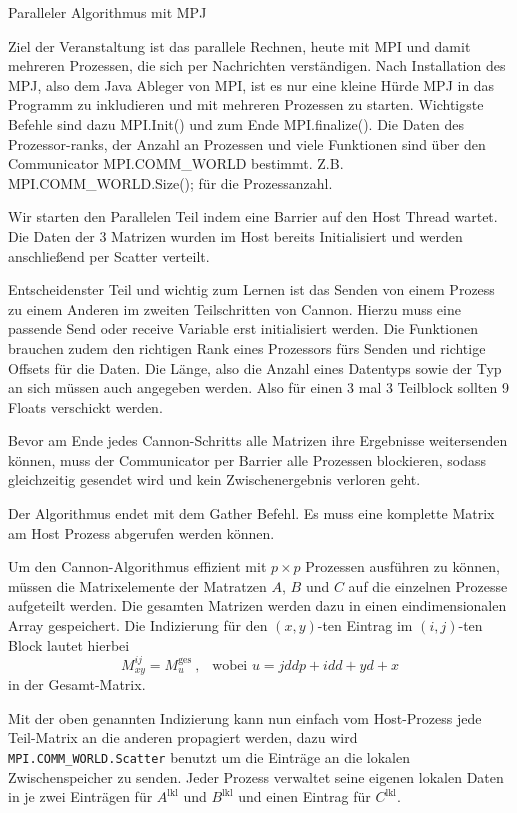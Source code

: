 \documentclass[
ngerman,
subtask=ruled %
]{tudaexercise}
\begin{document}
	
	\begin{task}{Paralleler Algorithmus mit MPJ}

		Ziel der Veranstaltung ist das parallele Rechnen, heute mit MPI und damit mehreren Prozessen, die sich per Nachrichten verständigen.
		Nach Installation des MPJ, also dem Java Ableger von MPI, ist es nur eine kleine Hürde MPJ in das Programm zu inkludieren und mit mehreren Prozessen zu starten.
		Wichtigste Befehle sind dazu MPI.Init() und zum Ende MPI.finalize(). Die Daten des Prozessor-ranks, der Anzahl an Prozessen und viele Funktionen sind über den Communicator MPI.COMM\_WORLD bestimmt. Z.B. MPI.COMM\_WORLD.Size(); für die Prozessanzahl.
		
		Wir starten den Parallelen Teil indem eine Barrier auf den Host Thread wartet.
		Die Daten der 3 Matrizen wurden im Host bereits Initialisiert und werden anschließend per Scatter verteilt.
		
		Entscheidenster Teil und wichtig zum Lernen ist das Senden von einem Prozess zu einem Anderen im zweiten Teilschritten von Cannon.
		Hierzu muss eine passende Send oder receive Variable erst initialisiert werden. Die Funktionen brauchen zudem den richtigen Rank eines Prozessors fürs Senden und richtige Offsets für die Daten. Die Länge, also die Anzahl eines Datentyps sowie der Typ an sich müssen auch angegeben werden. Also für einen 3 mal 3 Teilblock sollten 9 Floats verschickt werden.
		
		Bevor am Ende jedes Cannon-Schritts alle Matrizen ihre Ergebnisse weitersenden können, muss der Communicator per Barrier alle Prozessen blockieren, sodass gleichzeitig gesendet wird und kein Zwischenergebnis verloren geht.
		
		Der Algorithmus endet mit dem Gather Befehl. Es muss eine komplette Matrix am Host Prozess abgerufen werden können.
	

		Um den Cannon-Algorithmus effizient mit $p \times p$ Prozessen ausführen zu können,
		müssen die Matrixelemente der Matratzen $A$, $B$ und $C$ auf die einzelnen Prozesse aufgeteilt werden.
		Die gesamten Matrizen werden dazu in einen eindimensionalen Array gespeichert. 
		Die Indizierung für den $(x,y)$-ten Eintrag im $(i,j)$-ten Block lautet hierbei
		\begin{equation*}
			M_{xy}^{ij} = {M}_{u}^{\mathrm{ges}}~,~~\text{ wobei } u =jddp +idd + yd +x
		\end{equation*}
		in der Gesamt-Matrix.
		
		Mit der oben genannten Indizierung kann nun einfach vom Host-Prozess jede Teil-Matrix an die anderen propagiert werden,
		dazu wird \texttt{MPI.COMM\_WORLD.Scatter} benutzt um die Einträge an die lokalen Zwischenspeicher zu senden.
		Jeder Prozess verwaltet seine eigenen lokalen Daten in je zwei Einträgen für $A^{\mathrm{lkl}}$ und $B^{\mathrm{lkl}}$ und einen Eintrag für $C^{\mathrm{lkl}}$.
		

\end{task}
\end{document}
